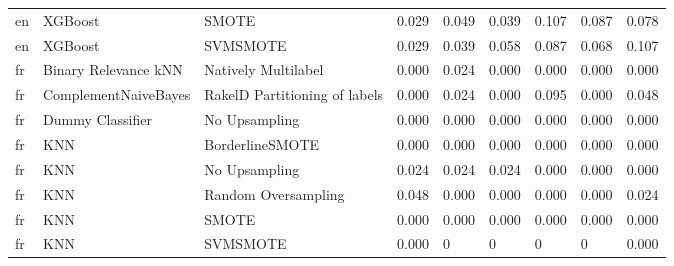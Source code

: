 \begin{tabular}{lllllllll}
      en &                         XGBoost &                         SMOTE &     0.029 &                     0.049 &                 0.039 &                  0.107 &                                   0.087 &     0.078 \\
      en &                         XGBoost &                      SVMSMOTE &     0.029 &                     0.039 &                 0.058 &                  0.087 &                                   0.068 &     0.107 \\
      fr &            Binary Relevance kNN &           Natively Multilabel &     0.000 &                     0.024 &                 0.000 &                  0.000 &                                   0.000 &     0.000 \\
      fr &            ComplementNaiveBayes & RakelD Partitioning of labels &     0.000 &                     0.024 &                 0.000 &                  0.095 &                                   0.000 &     0.048 \\
      fr &                Dummy Classifier &                 No Upsampling &     0.000 &                     0.000 &                 0.000 &                  0.000 &                                   0.000 &     0.000 \\
      fr &                             KNN &               BorderlineSMOTE &     0.000 &                     0.000 &                 0.000 &                  0.000 &                                   0.000 &     0.000 \\
      fr &                             KNN &                 No Upsampling &     0.024 &                     0.024 &                 0.024 &                  0.000 &                                   0.000 &     0.000 \\
      fr &                             KNN &           Random Oversampling &     0.048 &                     0.000 &                 0.000 &                  0.000 &                                   0.000 &     0.024 \\
      fr &                             KNN &                         SMOTE &     0.000 &                     0.000 &                 0.000 &                  0.000 &                                   0.000 &     0.000 \\
      fr &                             KNN &                      SVMSMOTE &     0.000 &                         0 &                     0 &                      0 &                                       0 &     0.000 \\

\end{tabular}

